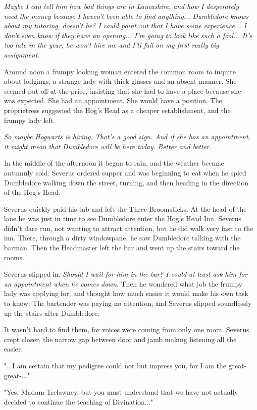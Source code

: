 \documentclass[a4paper,11pt]{article}
\begin{document}
\emph{Maybe I can tell him how bad things are in Lancashire, and how I desperately need the money because I haven't been able to find anything... Dumbledore knows about my tutoring, doesn't he? I could point out that I have some experience... I don't even know if they have an opening... I'm going to look like such a fool... It's too late in the year; he won't hire me and I'll fail on my first really big assignment.}

Around noon a frumpy looking woman entered the common room to inquire about lodgings, a strange lady with thick glasses and an absent manner. She seemed put off at the price, insisting that she had to have a place because she was expected. She had an appointment. She would have a position. The proprietress suggested the Hog's Head as a cheaper establishment, and the frumpy lady left.

\emph{So maybe Hogwarts is hiring. That's a good sign. And if she has an appointment, it might mean that Dumbledore will be here today. Better and better.}

In the middle of the afternoon it began to rain, and the weather became autumnly cold. Severus ordered supper and was beginning to eat when he spied Dumbledore walking down the street, turning, and then heading in the direction of the Hog's Head.

Severus quickly paid his tab and left the Three Broomsticks. At the head of the lane he was just in time to see Dumbledore enter the Hog's Head Inn. Severus didn't dare run, not wanting to attract attention, but he did walk very fast to the inn. There, through a dirty windowpane, he saw Dumbledore talking with the barman. Then the Headmaster left the bar and went up the stairs toward the rooms.

Severus slipped in. \emph{Should I wait for him in the bar? I could at least ask him for an appointment when he comes down.} Then he wondered what job the frumpy lady was applying for, and thought how much easier it would make his own task to know. The bartender was paying no attention, and Severus slipped soundlessly up the stairs after Dumbledore.

It wasn't hard to find them, for voices were coming from only one room. Severus crept closer, the narrow gap between door and jamb making listening all the easier.

"...I am certain that my pedigree could not but impress you, for I am the great-great-..."

"Yes, Madam Trelawney, but you must understand that we have not actually decided to continue the teaching of Divination..."
\end{document}
